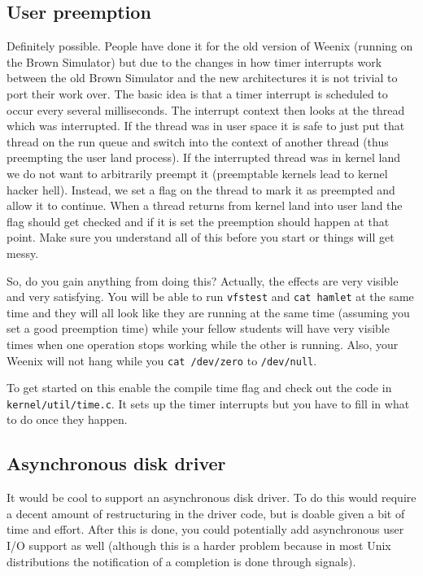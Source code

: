 \subsection{User preemption}
Definitely possible. People have done it for the old version of Weenix (running on the Brown Simulator) but due to the changes in how timer interrupts work between the old Brown Simulator and the new architectures it is not trivial to port their work over. The basic idea is that a timer interrupt is scheduled to occur every several milliseconds. The interrupt context then looks at the thread which was interrupted. If the thread was in user space it is safe to just put that thread on the run queue and switch into the context of another thread (thus preempting the user land process). If the interrupted thread was in kernel land we do not want to arbitrarily preempt it (preemptable kernels lead to kernel hacker hell). Instead, we set a flag on the thread to mark it as preempted and allow it to continue. When a thread returns from kernel land into user land the flag should get checked and if it is set the preemption should happen at that point. Make sure you understand all of this before you start or things will get messy.

So, do you gain anything from doing this? Actually, the effects are very visible and very satisfying. You will be able to run \texttt{vfstest} and \texttt{cat hamlet} at the same time and they will all look like they are running at the same time (assuming you set a good preemption time) while your fellow students will have very visible times when one operation stops working while the other is running. Also, your Weenix will not hang while you \texttt{cat /dev/zero} to \texttt{/dev/null}.

To get started on this enable the compile time flag and check out the code in \texttt{kernel/util/time.c}.  It sets up the timer interrupts but you have to fill in what to do once they happen.

\subsection{Asynchronous disk driver}
It would be cool to support an asynchronous disk driver. To do this would require a decent amount of restructuring in the driver code, but is doable given a bit of time and effort. After this is done, you could potentially add asynchronous user I/O support as well (although this is a harder problem because in most Unix distributions the notification of a completion is done through signals).

